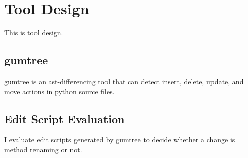 \chapter{Tool Design}
\label{chp:tool-design}

This is tool design.

\section{gumtree}

gumtree is an ast-differencing tool that can detect insert, delete, update, and move actions in python source files.

\section{Edit Script Evaluation}

I evaluate edit scripts generated by gumtree to decide whether a change is method renaming or not.
